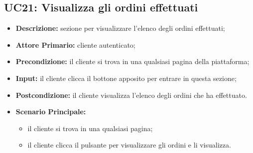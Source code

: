 \subsection{UC21: Visualizza gli ordini effettuati}
\label{sec:UC21}
\begin{itemize}
    \item \textbf{Descrizione:} sezione per visualizzare l'elenco degli ordini effettuati;
    \item \textbf{Attore Primario:} cliente autenticato;
    \item \textbf{Precondizione:} il cliente si trova in una qualsiasi pagina della piattaforma;
    \item \textbf{Input:} il cliente clicca il bottone apposito per entrare in questa sezione;
    \item \textbf{Postcondizione:} il cliente visualizza l'elenco degli ordini che ha effettuato.
    \item \textbf{Scenario Principale:}
          \begin{itemize}
              \item il cliente si trova in una qualsiasi pagina;
              \item il cliente clicca il pulsante per visualizzare gli ordini e li visualizza.
          \end{itemize}
\end{itemize}